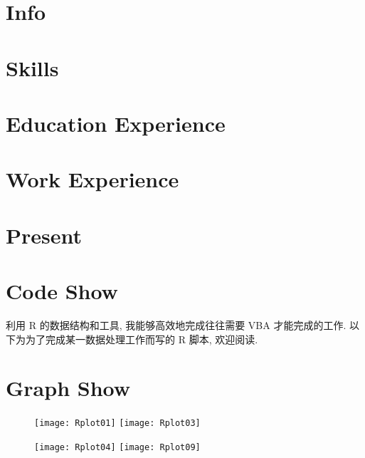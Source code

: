 \documentclass[a4paper]{article}
\begin{document}
	\section*{Info}
		
	\section*{Skills}
		
	\section*{Education Experience}
		
	\section*{Work Experience}
		
	\section*{Present}
		
	\section*{Code Show}
		利用 R 的数据结构和工具, 我能够高效地完成往往需要 VBA 才能完成的工作. 以下为为了完成某一数据处理工作而写的 R 脚本, 欢迎阅读.
			
			
		
			
	\section*{Graph Show}
		\begin{figure}
		\begin{center}
		\texttt{[image: Rplot01]}
		\texttt{[image: Rplot03]}
		\end{center}
		\end{figure}
		\begin{figure}
		\begin{center}
		\texttt{[image: Rplot04]}
		\texttt{[image: Rplot09]}
		\end{center}
		\end{figure}
\end{document}
